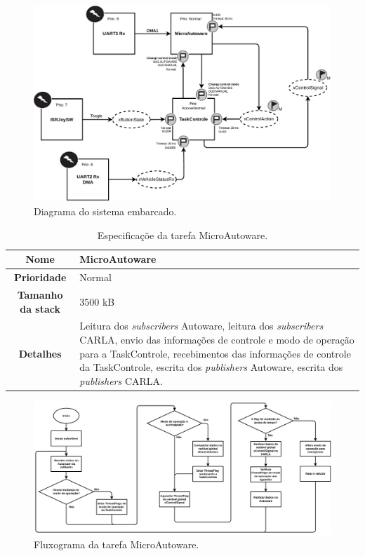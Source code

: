 \begin{figure}[H]
	\centering
	\includegraphics[width = \textwidth]{img/system_diagram}
	\caption{Diagrama do sistema embarcado.}
	\label{fig:systemdiagram}
\end{figure}

\begin{table}[H]
	\centering
	\begin{tabular}{c|p{11.5cm}}
		\textbf{Nome} & MicroAutoware \\
		\hline
		\textbf{Prioridade}& Normal \\
		\hline
		\textbf{Tamanho da stack} & 3500 kB \\
		\hline
		\textbf{Detalhes} & Leitura dos \textit{subscribers} Autoware, leitura dos \textit{subscribers} CARLA, envio das informações de controle e modo de operação para a TaskControle, recebimentos das informações de controle da TaskControle, escrita dos \textit{publishers} Autoware, escrita dos \textit{publishers} CARLA.\\
	\end{tabular}
	\caption{Especificaçõe da tarefa MicroAutoware.}
	\label{tab:microautoware}
\end{table}

\begin{figure}[H]
	\centering
	\includegraphics[width = \textwidth]{img/fluxograma_microautoware}
	\caption{Fluxograma da tarefa MicroAutoware.}
	\label{fig:fluxograma_microautoware}
\end{figure}

